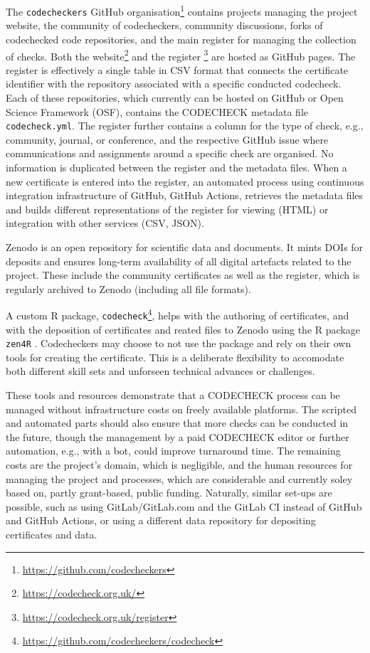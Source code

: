 \documentclass[12pt]{article}
\begin{document}
The \texttt{codecheckers} GitHub organisation\footnote{
\url{https://github.com/codecheckers}} contains projects managing the
project website, the community of codecheckers, community discussions,
forks of codechecked code repositories, and the main register for
managing the collection of checks. Both the website\footnote{
\url{https://codecheck.org.uk/}} and the register
\footnote{\url{https://codecheck.org.uk/register}} are hosted as GitHub
pages. The register is effectively a single table in CSV format that
connects the certificate identifier with the repository associated with
a specific conducted codecheck. Each of these repositories, which 
currently can be hosted on GitHub or Open Science Framework (OSF), 
contains the CODECHECK metadata file \texttt{codecheck.yml}. The register
further contains a column for the type of check, e.g., community, journal,
or conference, and the respective GitHub issue where communications and 
assignments around a specific check are organised. No information is 
duplicated between the register and the metadata files. When a new
certificate is entered into the register, an automated process using 
continuous integration infrastructure of GitHub, GitHub Actions, retrieves
the metadata files and builds different representations of the register
for viewing (HTML) or integration with other services (CSV, JSON).

Zenodo is an open repository for scientific data and documents. It
mints DOIs for deposits and ensures long-term availability of all digital
artefacts related to the project. These include the community 
certificates as well as the register, which is regularly archived to 
Zenodo \cite{codecheck_register} (including all file formats).

A custom R package, \texttt{codecheck}\footnote{
\url{https://github.com/codecheckers/codecheck}}, helps with the authoring
of certificates, and with the deposition of certificates and reated files to
Zenodo using the R package \texttt{zen4R} \cite{zen4r}.
Codecheckers may choose to not use the package and rely on their own tools
for creating the certificate. This is a deliberate flexibility to
accomodate both different skill sets and unforseen technical advances or
challenges.

These tools and resources demonstrate that a CODECHECK process can be
managed without infrastructure costs on freely available platforms.
The scripted and automated parts should also ensure that more checks can
be conducted in the future, though the management by a paid CODECHECK
editor or further automation, e.g., with a bot, could improve turnaround time.
The remaining costs are the project's domain, which is negligible, and
the human resources for managing the project and processes, which are
considerable and currently soley based on, partly grant-based, public funding.
Naturally, similar set-ups are possible, such as using GitLab/GitLab.com 
and the GitLab CI instead of GitHub and GitHub Actions, or using a different 
data repository for depositing certificates and data.
\end{document}
